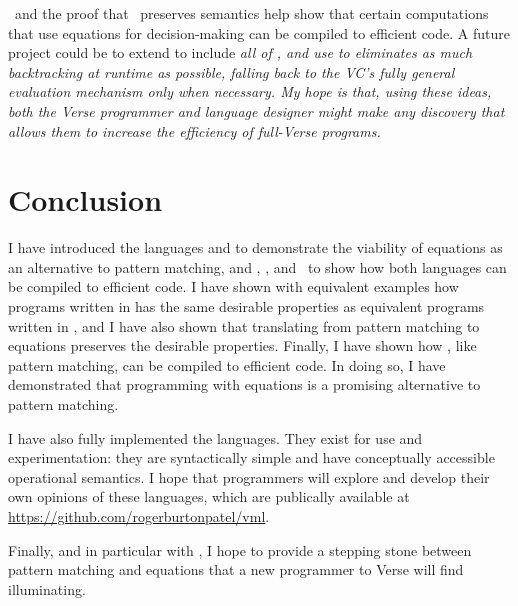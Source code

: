 \documentclass[manuscript,screen,review, 12pt, nonacm]{acmart}
\begin{document}
        \DTran\ and the proof that \DTran\ preserves semantics help show that
        certain computations that use equations for decision-making can be
        compiled to efficient code. A future project could be to extend \VMinus
        to include \it{all} of \VC, and use \DTran to eliminates as much
        backtracking at runtime as possible, falling back to the VC's fully
        general evaluation mechanism only when necessary. My hope is that, using
        these ideas, both the Verse programmer and language designer might make
        any discovery that allows them to increase the efficiency of full-Verse
        programs. 

    \section{Conclusion}

    I have introduced the languages \PPlus and \VMinus to demonstrate the
    viability of equations as an alternative to pattern matching, and \D,
    \PtoVTran, and \DTran\ to show how both languages can be compiled to
    efficient code. I have shown with equivalent examples how programs written
    in \VMinus has the same desirable properties as equivalent programs written
    in \PPlus, and I have also shown that translating from pattern matching to
    equations preserves the desirable properties. Finally, I have shown how
    \VMinus, like pattern matching, can be compiled to efficient code. In doing
    so, I have demonstrated that programming with equations is a promising
    alternative to pattern matching. 

    I have also fully implemented the languages. They exist for use and
    experimentation: they are syntactically simple and have conceptually
    accessible operational semantics. I hope that programmers will explore and
    develop their own opinions of these languages, which are publically
    available at \url{https://github.com/rogerburtonpatel/vml}. 

    Finally, and in particular with \VMinus, I hope to provide a stepping stone
    between pattern matching and equations that a new programmer to Verse will
    find illuminating. 
    
    
\end{document}
